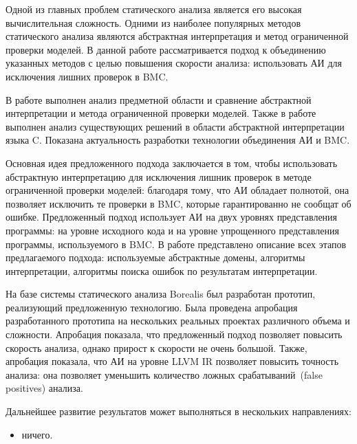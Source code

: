 \conclusion
Одной из главных проблем статического анализа является его высокая 
вычислительная сложность. Одними из наиболее популярных методов статического
анализа являются абстрактная интерпретация и метод ограниченной проверки моделей.
В данной работе рассматривается подход к объединению указанных методов с целью
повышения скорости анализа: использовать АИ для исключения лишних проверок в BMC.

В работе выполнен анализ предметной области и сравнение абстрактной интерпретации
и метода ограниченной проверки моделей. Также в работе выполнен анализ 
существующих решений в области абстрактной интерпретации языка C. Показана 
актуальность разработки технологии объединения АИ и BMC.

Основная идея предложенного подхода заключается в том, чтобы использовать 
абстрактную интерпретацию для исключения лишник проверок в методе ограниченной 
проверки моделей: благодаря тому, что АИ обладает полнотой, она позволяет 
исключить те проверки в BMC, которые гарантированно не сообщат об ошибке. 
Предложенный подход использует АИ на двух уровнях представления программы:
на уровне исходного кода и на уровне упрощенного представления программы, 
используемого в BMC. В работе представлено описание всех этапов предлагаемого
подхода: используемые абстрактные домены, алгоритмы интерпретации, алгоритмы
поиска ошибок по результатам интерпретации.

На базе системы статического анализа Borealis был разработан прототип, 
реализующий предложенную технологию. Была проведена апробация разработанного
прототипа на нескольких реальных проектах различного объема и сложности. 
Апробация показала, что предложенный подход позволяет повысить скорость анализа,
однако прирост к скорости не очень большой. Также, апробация показала, что
АИ на уровне LLVM IR позволяет повысить точность анализа: она позволяет уменьшить
количество ложных срабатываний~(false positives) анализа.

Дальнейшее развитие результатов может выполняться в нескольких направлениях:
\begin{itemize}
\item ничего.
\end{itemize}